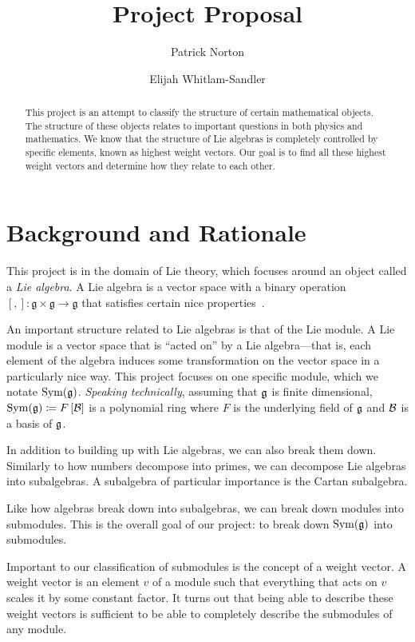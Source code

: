 \documentclass[11pt, reqno]{amsart}
\title{Project Proposal}
\author{Patrick Norton \and Elijah Whitlam-Sandler}
\begin{document}
\maketitle

\begin{abstract}
  This project is an attempt to classify the structure of certain mathematical
  objects. %
  The structure of these objects relates to important questions in both
  physics and mathematics. %
  We know that the structure of Lie algebras is completely controlled by
  specific elements, known as highest weight vectors. Our goal is to find all
  these highest weight vectors and determine how they relate to each other.
\end{abstract}

\section{Background and Rationale}

This project is in the domain of Lie theory, which focuses around an object
called a \emph{Lie algebra}. A Lie algebra is a vector space with a binary
operation $[,]: \mathfrak{g} \times \mathfrak{g} \rightarrow \mathfrak{g}$ that satisfies certain nice properties~\cite{Erd06}.

An important structure related to Lie algebras is that of the Lie module. A Lie
module is a vector space that is ``acted on'' by a Lie algebra---that is, each
element of the algebra induces some transformation on the vector space in a
particularly nice way. This project focuses on one specific module, which we
notate $\operatorname{Sym}(\mathfrak{g})$. \emph{Speaking technically}, assuming that $\mathfrak{g}$ is finite dimensional, $\operatorname{Sym}(\mathfrak{g})\coloneqq F\left[ \mathcal{B} \right]$ 
is a polynomial ring where $F$ is the underlying field of $\mathfrak{g}$ and $\mathcal{B}$ is a basis of $\mathfrak{g}$.

In addition to building up with Lie algebras, we can also break them down.
Similarly to how numbers decompose into primes, we can decompose Lie algebras
into subalgebras. A subalgebra of particular importance is the Cartan
subalgebra.

Like how algebras break down into subalgebras, we can break down modules into
submodules. This is the overall goal of our project: to break down $\operatorname{Sym}(\mathfrak{g})$
into submodules.

Important to our classification of submodules is the concept of a weight vector.
A weight vector is an element $v$ of a module such that everything that acts on
$v$ scales it by some constant factor. It turns out that being able to describe
these weight vectors is sufficient to be able to completely describe the
submodules of any module.
\end{document}
